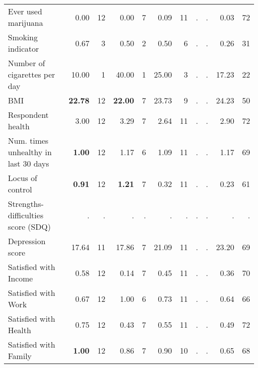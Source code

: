\begin{tabular}{l r r r r r r r r r r}
Ever used marijuana &      0.00 &        12 &      0.00 &         7 &      0.09 &        11 &         . & . &      0.03 &        72 \\
Smoking indicator &      0.67 &         3 &      0.50 &         2 &      0.50 &         6 &         . & . &      0.26 &        31 \\
Number of cigarettes per day &     10.00 &         1 &     40.00 &         1 &     25.00 &         3 &         . & . &     17.23 &        22 \\
BMI & \textbf{    22.78} &        12 & \textbf{    22.00} &         7 &     23.73 &         9 &         . & . &     24.23 &        50 \\
Respondent health &      3.00 &        12 &      3.29 &         7 &      2.64 &        11 &         . & . &      2.90 &        72 \\
Num. times unhealthy in last 30 days & \textbf{     1.00} &        12 &      1.17 &         6 &      1.09 &        11 &         . & . &      1.17 &        69 \\
Locus of control & \textbf{     0.91} &        12 & \textbf{     1.21} &         7 &      0.32 &        11 &         . & . &      0.23 &        61 \\
Strengths-difficulties score (SDQ) &         . & . &         . & . &         . & . &         . & . &         . & . \\
Depression score &     17.64 &        11 &     17.86 &         7 &     21.09 &        11 &         . & . &     23.20 &        69 \\
Satisfied with Income &      0.58 &        12 &      0.14 &         7 &      0.45 &        11 &         . & . &      0.36 &        70 \\
Satisfied with Work &      0.67 &        12 &      1.00 &         6 &      0.73 &        11 &         . & . &      0.64 &        66 \\
Satisfied with Health &      0.75 &        12 &      0.43 &         7 &      0.55 &        11 &         . & . &      0.49 &        72 \\
Satisfied with Family & \textbf{     1.00} &        12 &      0.86 &         7 &      0.90 &        10 &         . & . &      0.65 &        68 \\
\bottomrule
\end{tabular}
